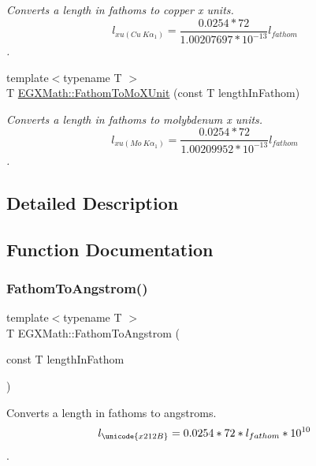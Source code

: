 \begin{DoxyCompactItemize}
\begin{DoxyCompactList}\small\item\em Converts a length in fathoms to copper x units. \[ l_{xu(Cu\ K\alpha_1)}=\frac{0.0254 * 72}{1.00207697*10^{-13}} l_{fathom}\]. \end{DoxyCompactList}\item 
{\footnotesize template$<$typename T $>$ }\\T \mbox{\hyperlink{group___e_g_x_math-_conversions-_length_conversions-_imperial-_fathom-_non-_s_i_ga1e69cf778d1b7f72cd015b6cc81fc71c}{E\+G\+X\+Math\+::\+Fathom\+To\+Mo\+X\+Unit}} (const T length\+In\+Fathom)
\begin{DoxyCompactList}\small\item\em Converts a length in fathoms to molybdenum x units. \[ l_{xu(Mo\ K\alpha_1)}=\frac{0.0254 * 72}{1.00209952*10^{-13}} l_{fathom}\]. \end{DoxyCompactList}\end{DoxyCompactItemize}


\subsection{Detailed Description}


\subsection{Function Documentation}
\mbox{\label{group___e_g_x_math-_conversions-_length_conversions-_imperial-_fathom-_non-_s_i_gac03859840078c2a19cbf1f79bcf2b919}} 
\subsubsection{\texorpdfstring{Fathom\+To\+Angstrom()}{FathomToAngstrom()}}
{\footnotesize\ttfamily template$<$typename T $>$ \\
T E\+G\+X\+Math\+::\+Fathom\+To\+Angstrom (\begin{DoxyParamCaption}\item[{const T}]{length\+In\+Fathom }\end{DoxyParamCaption})}



Converts a length in fathoms to angstroms. \[ l_{\unicode{x212B}}=0.0254 * 72 * l_{fathom} * 10^{10} \]. 

